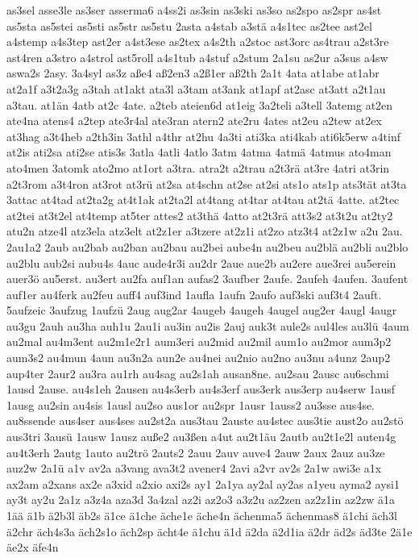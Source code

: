 {as3sel
asse3le
as3ser
asserma6
a4ss2i
as3sin
as3ski
as3so
as2spo
as2spr
as4st
as5sta
as5stei
as5sti
as5str
as5stu
2asta
a4stab
a3stä
a4s1tec
as2tee
ast2el
a4stemp
a4s3tep
ast2er
a4st3ese
as2tex
a4s2th
a2stoc
ast3orc
as4trau
a2st3re
ast4ren
a3stro
a4strol
ast5roll
a4s1tub
a4stuf
a2stum
2a1su
as2ur
a3sus
a4sw
aswa2s
2asy.
3a4syl
as3z
aße4
aß2en3
a2ß1er
aß2th
2a1t
4ata
at1abe
at1abr
at2a1f
a3t2a3g
a3tah
at1akt
ata3l
a3tam
at3ank
at1apf
at2asc
at3att
a2t1au
a3tau.
at1än
4atb
at2c
4ate.
a2teb
ateien6d
at1eig
3a2teli
a3tell
3atemg
at2en
ate4na
atens4
a2tep
ate3r4al
ate3ran
atern2
ate2ru
4ates
at2eu
a2tew
at2ex
at3hag
a3t4heb
a2th3in
3athl
a4thr
at2hu
4a3ti
ati3ka
ati4kab
ati6k5erw
a4tinf
at2is
ati2sa
ati2se
atis3s
3atla
4atli
4atlo
3atm
4atma
4atmä
4atmus
ato4man
ato4men
3atomk
ato2mo
at1ort
a3tra.
atra2t
a2trau
a2t3rä
at3re
4atri
at3rin
a2t3rom
a3t4ron
at3rot
at3rü
at2sa
at4schn
at2se
at2si
ats1o
ats1p
ats3tät
at3ta
3attac
at4tad
at2ta2g
at4t1ak
at2ta2l
at4tang
at4tar
at4tau
at2tä
4atte.
at2tec
at2tei
at3t2el
at4temp
at5ter
attes2
at3thä
4atto
at2t3rä
att3s2
at3t2u
at2ty2
atu2n
atze4l
atz3ela
atz3elt
at2z1er
a3tzere
at2z1i
at2zo
atz3t4
at2z1w
a2u
2au.
2au1a2
2aub
au2bab
au2ban
au2bau
au2bei
aube4n
au2beu
au2blä
au2bli
au2blo
au2blu
aub2si
aubu4s
4auc
aude4r3i
au2dr
2aue
aue2b
au2ere
aue3rei
au5erein
auer3ö
au5erst.
au3ert
au2fa
auf1an
aufas2
3aufber
2aufe.
2aufeh
4aufen.
3aufent
auf1er
au4ferk
au2feu
auff4
auf3ind
1aufla
1aufn
2aufo
auf3ski
auf3t4
2auft.
5aufzeic
3aufzug
1aufzü
2aug
aug2ar
4augeb
4augeh
4augel
aug2er
4augl
4augr
au3gu
2auh
au3ha
auh1u
2au1i
au3in
au2is
2auj
auk3t
aule2s
aul4les
au3lü
4aum
au2mal
au4m3ent
au2m1e2r1
aum3eri
au2mid
au2mil
aum1o
au2mor
aum3p2
aum3s2
au4mun
4aun
au3n2a
aun2e
au4nei
au2nio
au2no
au3nu
a4unz
2aup2
aup4ter
2aur2
au3ra
au1rh
au4sag
au2s1ah
ausan8ne.
au2sau
2ausc
au6schmi
1ausd
2ause.
au4s1eh
2ausen
au4s3erb
au4s3erf
aus3erk
aus3erp
au4serw
1ausf
1ausg
au2sin
au4sis
1ausl
au2so
aus1or
au2spr
1ausr
1auss2
au3sse
aus4se.
au8ssende
aus4ser
aus4ses
au2st2a
aus3tau
2auste
au4stec
aus3tie
aust2o
au2stö
aus3tri
3ausü
1ausw
1ausz
auße2
au3ßen
a4ut
au2t1äu
2autb
au2t1e2l
auten4g
au4t3erh
2autg
1auto
au2trö
2auts2
2auu
2auv
auve4
2auw
2aux
2auz
au3ze
auz2w
2a1ü
a1v
av2a
a3vang
ava3t2
avener4
2avi
a2vr
av2s
2a1w
awi3e
a1x
ax2am
a2xans
ax2e
a3xid
a2xio
axi2s
ay1
2a1ya
ay2al
ay2as
a1yeu
ayma2
aysi1
ay3t
ay2u
2a1z
a3z4a
aza3d
3a4zal
az2i
az2o3
a3z2u
az2zen
az2z1in
az2zw
ä1a
1ää
ä1b
ä2b3l
äb2s
ä1ce
ä1che
äche1e
äche4n
ächenma5
ächenmas8
ä1chi
äch3l
ä2chr
äch4s3a
äch2s1o
äch2sp
ächt4e
ä1chu
ä1d
ä2da
ä2d1ia
ä2dr
äd2s
äd3te
2ä1e
äe2x
äfe4n
}
